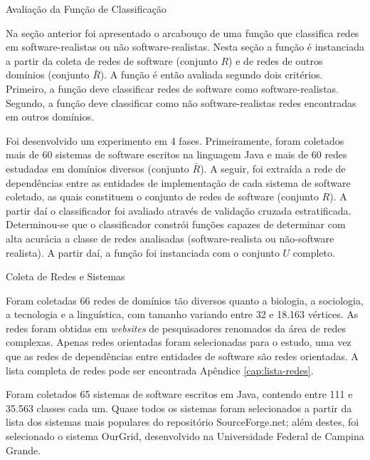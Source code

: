 \begin{section}{Avaliação da Função de Classificação}



Na seção anterior foi apresentado o arcabouço de uma função que classifica redes em software-realistas ou não software-realistas. Nesta seção a função é instanciada a partir da coleta de redes de software (conjunto $R$) e de redes de outros domínios (conjunto $\bar{R}$). A função é então avaliada segundo dois critérios. Primeiro, a função deve classificar redes de software como software-realistas. Segundo, a função deve classificar como não software-realistas redes encontradas em outros domínios.

Foi desenvolvido um experimento em 4 fases. Primeiramente, foram coletados mais de 60 sistemas de software escritos na linguagem Java e mais de 60 redes estudadas em domínios diversos (conjunto $\bar{R}$). A seguir, foi extraída a rede de dependências entre as entidades de implementação de cada sistema de software coletado, as quais constituem o conjunto de redes de software (conjunto $R$). A partir daí o classificador foi avaliado através de validação cruzada estratificada. Determinou-se que o classificador constrói funções capazes de determinar com alta acurácia a classe de redes analisadas (software-realista ou não-software realista). A partir daí, a função foi instanciada com o conjunto $U$ completo.

\begin{subsection}{Coleta de Redes e Sistemas}
	
	Foram coletadas 66 redes de domínios tão diversos quanto a biologia, a sociologia, a tecnologia e a linguística, com tamanho variando entre 32 e 18.163 vértices. As redes foram obtidas em \emph{websites} de pesquisadores renomados da área de redes complexas. Apenas redes orientadas foram selecionadas para o estudo, uma vez que as redes de dependências entre entidades de software são redes orientadas. A lista completa de redes pode ser encontrada Apêndice \ref{cap:lista-redes}.

  Foram coletados 65 sistemas de software escritos em Java, contendo entre 111 e 35.563 classes cada um. Quase todos os sistemas foram selecionados a partir da lista dos sistemas mais populares do repositório SourceForge.net; além destes, foi selecionado o sistema OurGrid, desenvolvido na Universidade Federal de Campina Grande. 


\end{subsection}
\end{section}
